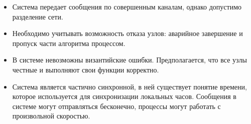 \begin{itemize}
    \item Система передает сообщения по совершенным каналам, однако допустимо
        разделение сети.
    \item Необходимо учитывать возможность отказа узлов: аварийное завершение и
        пропуск части алгоритма процессом.
    \item В системе невозможны византийские ошибки. Предполагается, что все узлы
        честные и выполняют свои функции корректно.
    \item Система является частично синхронной, в ней существует понятие времени,
        которое используется для синхронизации локальных часов. Сообщения в системе
        могут отправляться бесконечно, процессы могут работать с произвольной
        скоростью.
\end{itemize}
